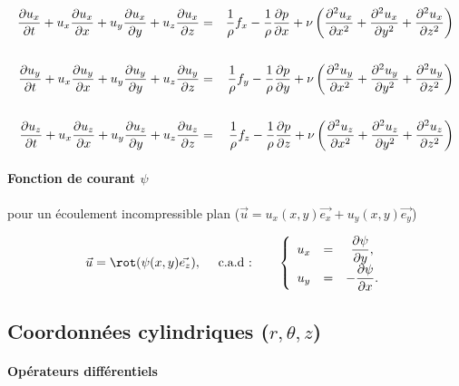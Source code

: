 \begin{eqnarray*}
\dpa{u_x}{t} + u_x \dpa{u_x}{x} + u_y \dpa{u_x}{y} + u_z \dpa{u_x}{z} & = &
\frac{1}{\rho} f_x - \frac{1}{\rho} \dpa{p}{x}
+ \nu \left ( \ddpa{u_x}{x} + \ddpa{u_x}{y} + \ddpa{u_x}{z} \right )
\\ & & \\
\dpa{u_y}{t} + u_x \dpa{u_y}{x} + u_y \dpa{u_y}{y} + u_z \dpa{u_y}{z} & = &
\frac{1}{\rho} f_y - \frac{1}{\rho} \dpa{p}{y}
+ \nu \left ( \ddpa{u_y}{x} + \ddpa{u_y}{y} + \ddpa{u_y}{z} \right )
\\ & & \\
\dpa{u_z}{t} + u_x \dpa{u_z}{x} + u_y \dpa{u_z}{y} + u_z \dpa{u_z}{z} & = &
\frac{1}{\rho} f_z - \frac{1}{\rho} \dpa{p}{z}
+ \nu \left ( \ddpa{u_z}{x} + \ddpa{u_z}{y} + \ddpa{u_z}{z} \right )
\end{eqnarray*}


\paragraph{Fonction de courant $\psi$ } pour un écoulement incompressible plan 
($\vec{u} = u_x(x,y) \vec{e_x} + u_y(x,y) \vec{e_y}$)


\begin{equation}
 \vec{u} = \rot (\psi(x,y) \vec{e_z}), 
\quad \mbox{ c.a.d :} \quad \quad 
\left\{
\begin{array}{ccc}
 u_x &=& \displaystyle \dpa{\psi}{y}, \\
 u_y &=& \displaystyle -\dpa{\psi}{x}.
\end{array}
\right.
\end{equation}







\clearpage


\subsection{Coordonn\'ees cylindriques ($r,\theta,z$)}

\vspace{5mm}

\paragraph{Opérateurs différentiels}

